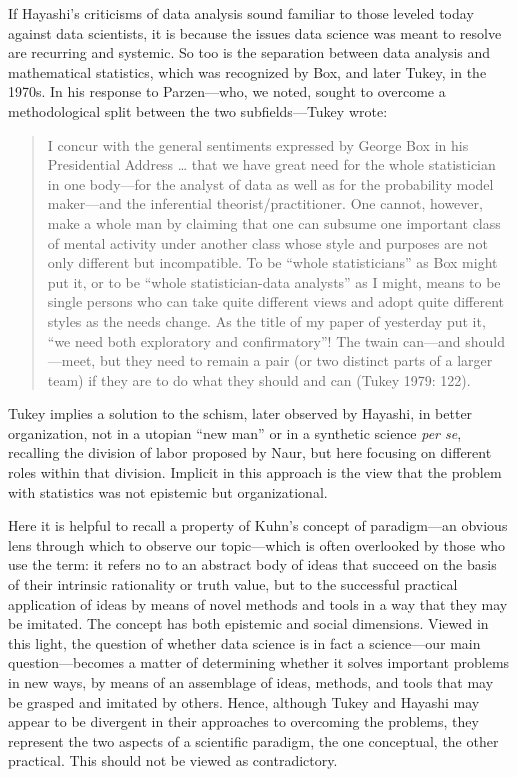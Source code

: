 \documentclass[
  letterpaper,
]{report}
\begin{document}
If Hayashi's criticisms of data analysis sound familiar to those leveled
today against data scientists, it is because the issues data science was
meant to resolve are recurring and systemic. So too is the separation
between data analysis and mathematical statistics, which was recognized
by Box, and later Tukey, in the 1970s. In his response to Parzen---who,
we noted, sought to overcome a methodological split between the two
subfields---Tukey wrote:

\begin{quote}
I concur with the general sentiments expressed by George Box in his
Presidential Address \ldots{} that we have great need for the whole
statistician in one body---for the analyst of data as well as for the
probability model maker---and the inferential theorist/practitioner. One
cannot, however, make a whole man by claiming that one can subsume one
important class of mental activity under another class whose style and
purposes are not only different but incompatible. To be ``whole
statisticians'' as Box might put it, or to be ``whole statistician-data
analysts'' as I might, means to be single persons who can take quite
different views and adopt quite different styles as the needs change. As
the title of my paper of yesterday put it, ``we need both exploratory
and confirmatory''! The twain can---and should---meet, but they need to
remain a pair (or two distinct parts of a larger team) if they are to do
what they should and can (Tukey 1979: 122).
\end{quote}

Tukey implies a solution to the schism, later observed by Hayashi, in
better organization, not in a utopian ``new man'' or in a synthetic
science \emph{per se}, recalling the division of labor proposed by Naur,
but here focusing on different roles within that division. Implicit in
this approach is the view that the problem with statistics was not
epistemic but organizational.

Here it is helpful to recall a property of Kuhn's concept of
paradigm---an obvious lens through which to observe our topic---which is
often overlooked by those who use the term: it refers no to an abstract
body of ideas that succeed on the basis of their intrinsic rationality
or truth value, but to the successful practical application of ideas by
means of novel methods and tools in a way that they may be imitated. The
concept has both epistemic and social dimensions. Viewed in this light,
the question of whether data science is in fact a science---our main
question---becomes a matter of determining whether it solves important
problems in new ways, by means of an assemblage of ideas, methods, and
tools that may be grasped and imitated by others. Hence, although Tukey
and Hayashi may appear to be divergent in their approaches to overcoming
the problems, they represent the two aspects of a scientific paradigm,
the one conceptual, the other practical. This should not be viewed as
contradictory.
\end{document}
